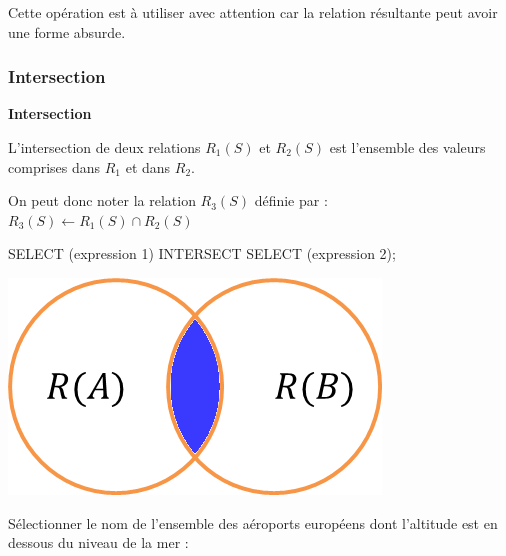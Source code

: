 \documentclass[10pt]{article}
\newif\ifprofvar
\begin{document}
\begin{rem}
Cette opération est à utiliser avec attention car la relation résultante peut avoir une forme absurde.
\end{rem}

\subsubsection{Intersection}
\begin{defi}
\begin{minipage}[c]{.75\linewidth}
\textbf{Intersection}

L'intersection de deux relations $R_1(S)$ et $R_2(S)$ est l'ensemble des valeurs comprises dans $R_1$ et dans $R_2$. 

On peut donc noter la relation $R_3(S)$ définie par : $R_3(S)\leftarrow R_1(S)\cap R_2(S)$

\begin{envsql}
\begin{sql}
SELECT  (expression 1) INTERSECT SELECT (expression 2);
\end{sql}
\end{envsql}
\end{minipage}\hfill
\begin{minipage}[c]{.2\linewidth}
\begin{center}
\includegraphics[width=.95\textwidth]{images/inter}
\end{center}
\end{minipage}
\end{defi}

\begin{exemple}
Sélectionner le nom de l'ensemble des aéroports européens dont l'altitude est en dessous du niveau de la mer :
\ifprofvar
$$
\pi_{\text{name}}\left(\sigma_{\text{continent}=''EU''}(\text{airports}) \cap \sigma_{\text{elevation\_ft}\leq0}(\text{airports}) \right)
$$
\begin{envsql}
\begin{sql}
SELECT name FROM airports WHERE continent=''EU''
    INTERSECT SELECT name FROM airports WHERE elevation_ft<=0;
\end{sql}
\end{envsql}
\else
\vspace{4cm}
\fi

\end{exemple}
\end{document}
